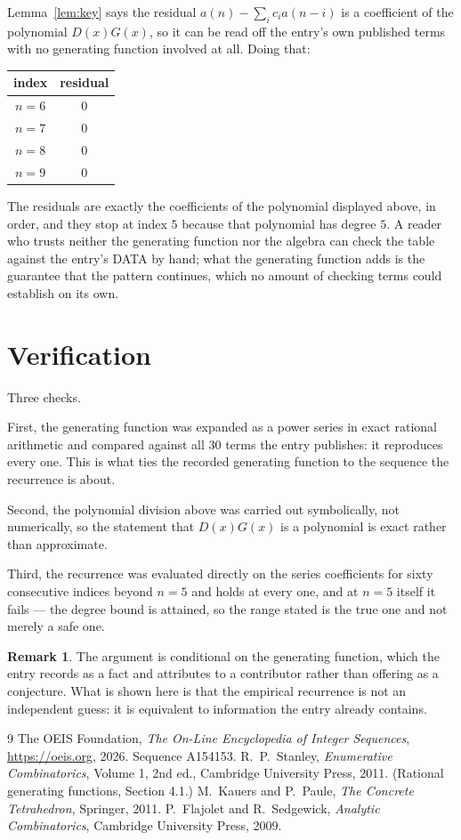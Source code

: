 \documentclass[11pt,a4paper]{article}
\theoremstyle{plain}
\theoremstyle{definition}
\newtheorem{remark}[theorem]{Remark}
\begin{document}
Lemma~\ref{lem:key} says the residual $a(n)-\sum_ic_ia(n-i)$ is a coefficient of the
polynomial $D(x)G(x)$, so it can be read off the entry's own published terms with no
generating function involved at all. Doing that:
\begin{center}
\begin{tabular}{cc}
index & residual \\ \hline
$n=6$ & $0$ \\
$n=7$ & $0$ \\
$n=8$ & $0$ \\
$n=9$ & $0$
\end{tabular}
\end{center}
The residuals are exactly the coefficients of the polynomial displayed above, in order, and
they stop at index $5$ because that polynomial has degree $5$. A reader who trusts
neither the generating function nor the algebra can check the table against the entry's DATA
by hand; what the generating function adds is the guarantee that the pattern continues, which
no amount of checking terms could establish on its own.

\section{Verification}

Three checks.

First, the generating function was expanded as a power series in exact rational arithmetic and
compared against all $30$ terms the entry publishes: it reproduces every one. This is
what ties the recorded generating function to the sequence the recurrence is about.

Second, the polynomial division above was carried out symbolically, not numerically, so the
statement that $D(x)G(x)$ is a polynomial is exact rather than approximate.

Third, the recurrence was evaluated directly on the series coefficients for sixty consecutive
indices beyond $n=5$ and holds at every one, and at $n=5$ itself it fails --- the
degree bound is attained, so the range stated is the true one and not merely a safe one.

\begin{remark}
The argument is conditional on the generating function, which the entry records as a fact and
attributes to a contributor rather than offering as a conjecture. What is shown here is that
the empirical recurrence is not an independent guess: it is equivalent to information the
entry already contains.
\end{remark}

\begin{thebibliography}{9}
 The OEIS Foundation, \emph{The On-Line Encyclopedia of Integer
Sequences}, \url{https://oeis.org}, 2026. Sequence A154153.
 R.~P.~Stanley, \emph{Enumerative Combinatorics}, Volume 1, 2nd ed.,
Cambridge University Press, 2011. (Rational generating functions, Section 4.1.)
 M.~Kauers and P.~Paule, \emph{The Concrete Tetrahedron}, Springer, 2011.
 P.~Flajolet and R.~Sedgewick, \emph{Analytic Combinatorics}, Cambridge
University Press, 2009.
\end{thebibliography}
\end{document}

